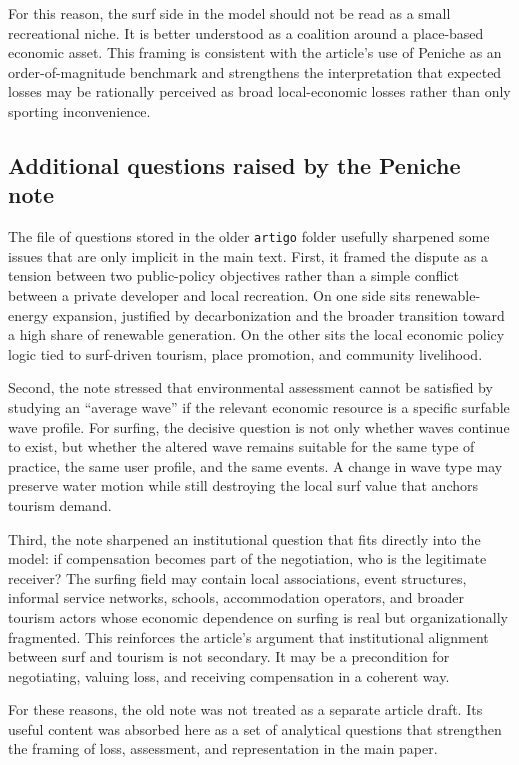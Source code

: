For this reason, the surf side in the model should not be read as a small recreational niche. It is better understood as a coalition around a place-based economic asset. This framing is consistent with the article's use of Peniche as an order-of-magnitude benchmark and strengthens the interpretation that expected losses may be rationally perceived as broad local-economic losses rather than only sporting inconvenience.

\subsection{Additional questions raised by the Peniche note}

The file of questions stored in the older \texttt{artigo} folder usefully sharpened some issues that are only implicit in the main text. First, it framed the dispute as a tension between two public-policy objectives rather than a simple conflict between a private developer and local recreation. On one side sits renewable-energy expansion, justified by decarbonization and the broader transition toward a high share of renewable generation. On the other sits the local economic policy logic tied to surf-driven tourism, place promotion, and community livelihood.

Second, the note stressed that environmental assessment cannot be satisfied by studying an ``average wave'' if the relevant economic resource is a specific surfable wave profile. For surfing, the decisive question is not only whether waves continue to exist, but whether the altered wave remains suitable for the same type of practice, the same user profile, and the same events. A change in wave type may preserve water motion while still destroying the local surf value that anchors tourism demand.

Third, the note sharpened an institutional question that fits directly into the model: if compensation becomes part of the negotiation, who is the legitimate receiver? The surfing field may contain local associations, event structures, informal service networks, schools, accommodation operators, and broader tourism actors whose economic dependence on surfing is real but organizationally fragmented. This reinforces the article's argument that institutional alignment between surf and tourism is not secondary. It may be a precondition for negotiating, valuing loss, and receiving compensation in a coherent way.

For these reasons, the old note was not treated as a separate article draft. Its useful content was absorbed here as a set of analytical questions that strengthen the framing of loss, assessment, and representation in the main paper.

